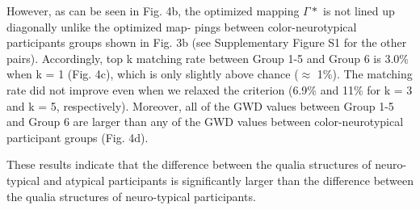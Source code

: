 \documentclass[
  authoryear]{elsarticle}
\begin{document}
However, as can be seen in Fig. 4b, the optimized mapping \(\Gamma*\) is
not lined up diagonally unlike the optimized map- pings between
color-neurotypical participants groups shown in Fig. 3b (see
Supplementary Figure S1 for the other pairs). Accordingly, top k
matching rate between Group 1-5 and Group 6 is 3.0\% when k = 1 (Fig.
4c), which is only slightly above chance (\(\approx\) 1\%). The matching
rate did not improve even when we relaxed the criterion (6.9\% and 11\%
for k = 3 and k = 5, respectively). Moreover, all of the GWD values
between Group 1-5 and Group 6 are larger than any of the GWD values
between color-neurotypical participant groups (Fig. 4d).

These results indicate that the difference between the qualia structures
of neuro-typical and atypical participants is significantly larger than
the difference between the qualia structures of neuro-typical
participants.
\end{document}
